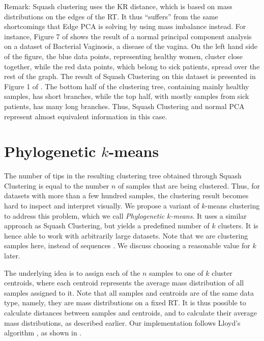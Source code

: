 Remark:
Squash clustering uses the KR distance, which is based on mass distributions on the edges of the \ac{RT}.
It thus ``suffers'' from the same shortcomings that Edge PCA is solving by using mass imbalance instead.
For instance, Figure 7 of \cite{Matsen2011a} shows the result of a normal principal component analysis
on a dataset of Bacterial Vaginosis, a disease of the vagina.
On the left hand side of the figure, the blue data points, representing healthy women, cluster close together,
while the red data points, which belong to sick patients, spread over the rest of the graph.
The result of Squash Clustering on this dataset is presented in Figure 1 of \cite{Srinivasan2012}.
The bottom half of the clustering tree, containing mainly healthy samples, has short branches,
while the top half, with mostly samples from sick patients, has many long branches.
Thus, Squash Clustering and normal PCA represent almost equivalent information in this case.


\section{Phylogenetic \texorpdfstring{$k$-means}{k-means}}
\label{ch:Clustering:sec:PhylogeneticKmeans}

The number of tips in the resulting clustering tree obtained through Squash Clustering
is equal to the number $n$ of samples that are being clustered.
Thus, for datasets with more than a few hundred samples,
the clustering result becomes hard to inspect and interpret visually.
We propose a variant of $k$-means clustering \cite{Macqueen1967} to address this problem,
which we call \emph{Phylogenetic $k$-means}.
It uses a similar approach as Squash Clustering, but yields a predefined number of $k$ clusters.
It is hence able to work with arbitrarily large datasets.
Note that we are clustering samples here, instead of sequences \cite{Kelley2010}.
We discuss choosing a reasonable value for $k$ later.

The underlying idea is to assign each of the $n$ samples to one of $k$ cluster centroids,
where each centroid represents the average mass distribution of all samples assigned to it.
Note that all samples and centroids are of the same data type,
namely, they are mass distributions on a fixed \ac{RT}.
It is thus possible to calculate distances between samples and centroids,
and to calculate their average mass distributions, as described earlier.
Our implementation follows Lloyd's algorithm \cite{Lloyd1982},
as shown in .


